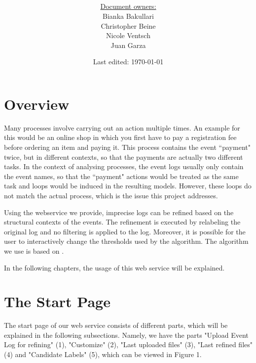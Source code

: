 \documentclass[notitlepage]{article}
\title{%
	\documentName\text{ } \\
  \large \projectName\text{ } \\
  }
\author{
	\large \underline{Document owners:}\\ 
	Bianka Bakullari\\
	\texttt{}
	Christopher Beine\\
	\texttt{}
	Nicole Ventsch\\
	\texttt{}
	Juan Garza\\
	\texttt{}
}
\date{\small{Last edited: \today}}
\begin{document}
\begin{titlepage}
\clearpage\maketitle			%
\thispagestyle{fancy}
\tableofcontents
\end{titlepage}

\rfoot{\thepage}				%


\begin{flushleft}				%

\section{Overview}

Many processes involve carrying out an action multiple times. An example for this would be an online shop in which you first have to pay a registration fee before ordering an item and paying it. This process contains the event ``payment" twice, but in different contexts, so that the payments are actually two different tasks. In the context of analysing processes, the event logs usually only contain the event names, so that the ``payment" actions would be treated as the same task and loops would be induced in the resulting models. However, these loops do not match the actual process, which is the issue this project addresses. 

Using the webservice we provide, imprecise logs can be refined based on the structural contexts of the events. The refinement is executed by relabeling the original log and no filtering is applied to the log. Moreover, it is possible for the user to interactively change the thresholds used by the algorithm. The algorithm we use is based on \cite{paper}.

In the following chapters, the usage of this web service will be explained.




\section{The Start Page}

The start page of our web service consists of different parts, which will be explained in the following subsections. Namely, we have the parts "Upload Event Log for refining" (1), "Customize" (2), "Last uploaded files" (3), "Last refined files" (4) and "Candidate Labels" (5), which can be viewed in Figure 1.


\end{flushleft}
\end{document}
